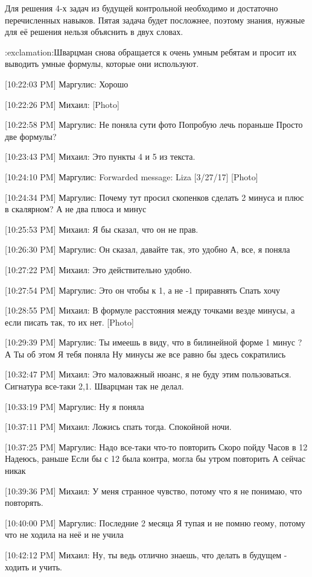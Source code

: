 \documentclass{article}
\begin{document}
Для решения 4-х задач из будущей контрольной необходимо и достаточно перечисленных навыков. Пятая задача будет посложнее, поэтому знания, нужные для её решения нельзя объяснить в двух словах.

:exclamation:Шварцман снова обращается к очень умным ребятам и просит их выводить умные формулы, которые они используют.

[10:22:03 PM] Маргулис:
Хорошо

[10:22:26 PM] Михаил:
[Photo]

[10:22:58 PM] Маргулис:
Не поняла сути фото
 Попробую лечь пораньше
 Просто две формулы?

[10:23:43 PM] Михаил:
Это пункты 4 и 5 из текста.

[10:24:10 PM] Маргулис:
Forwarded message: 
Liza [3/27/17] 
[Photo]

[10:24:34 PM] Маргулис:
Почему тут просил скопенков сделать 2 минуса и плюс в скалярном?
 А не два плюса и минус

[10:25:53 PM] Михаил:
Я бы сказал, что он не прав.

[10:26:30 PM] Маргулис:
Он сказал, давайте так, это удобно
 А, все, я поняла

[10:27:22 PM] Михаил:
Это действительно удобно.

[10:27:54 PM] Маргулис:
Это он чтобы к 1, а не -1 приравнять
 Спать хочу

[10:28:55 PM] Михаил:
В формуле расстояния между точками везде минусы, а если писать так, то их нет.
 [Photo]

[10:29:39 PM] Маргулис:
Ты имеешь в виду, что в билинейной форме 1 минус
 ?
 А
 Ты об этом
 Я тебя поняла
 Ну минусы же все равно бы здесь сократились

[10:32:47 PM] Михаил:
Это маловажный нюанс, я не буду этим пользоваться. Сигнатура все-таки 2,1. Шварцман так не делал.

[10:33:19 PM] Маргулис:
Ну я поняла

[10:37:11 PM] Михаил:
Ложись спать тогда. Спокойной ночи.

[10:37:25 PM] Маргулис:
Надо все-таки что-то повторить
 Скоро пойду
 Часов в 12
 Надеюсь, раньше
 Если бы с 12 была контра, могла бы утром повторить
 А сейчас никак

[10:39:36 PM] Михаил:
У меня странное чувство, потому что я не понимаю, что повторять.

[10:40:00 PM] Маргулис:
Последние 2 месяца
 Я тупая и не помню геому, потому что не ходила на неё и не учила

[10:42:12 PM] Михаил:
Ну, ты ведь отлично знаешь, что делать в будущем - ходить и учить.
\end{document}
